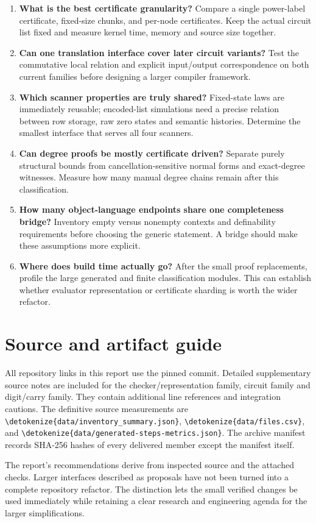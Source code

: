 \documentclass[11pt,letterpaper]{article}
\newcommand{\code}[1]{\expandafter\nolinkurl\expandafter{\detokenize{#1}}}
\begin{document}
\begin{enumerate}
\item \textbf{What is the best certificate granularity?} Compare a single power-label certificate, fixed-size chunks, and per-node certificates. Keep the actual circuit list fixed and measure kernel time, memory and source size together.
\item \textbf{Can one translation interface cover later circuit variants?} Test the commutative local relation and explicit input/output correspondence on both current families before designing a larger compiler framework.
\item \textbf{Which scanner properties are truly shared?} Fixed-state laws are immediately reusable; encoded-list simulations need a precise relation between row storage, raw zero states and semantic histories. Determine the smallest interface that serves all four scanners.
\item \textbf{Can degree proofs be mostly certificate driven?} Separate purely structural bounds from cancellation-sensitive normal forms and exact-degree witnesses. Measure how many manual degree chains remain after this classification.
\item \textbf{How many object-language endpoints share one completeness bridge?} Inventory empty versus nonempty contexts and definability requirements before choosing the generic statement. A bridge should make these assumptions more explicit.
\item \textbf{Where does build time actually go?} After the small proof replacements, profile the large generated and finite classification modules. This can establish whether evaluator representation or certificate sharding is worth the wider refactor.
\end{enumerate}

\section*{Source and artifact guide}

All repository links in this report use the pinned commit. Detailed supplementary source notes are included for the checker/representation family, circuit family and digit/carry family. They contain additional line references and integration cautions. The definitive source measurements are \code{data/inventory_summary.json}, \code{data/files.csv}, and \code{data/generated-steps-metrics.json}. The archive manifest records SHA-256 hashes of every delivered member except the manifest itself.

The report's recommendations derive from inspected source and the attached checks. Larger interfaces described as proposals have not been turned into a complete repository refactor. The distinction lets the small verified changes be used immediately while retaining a clear research and engineering agenda for the larger simplifications.
\end{document}
